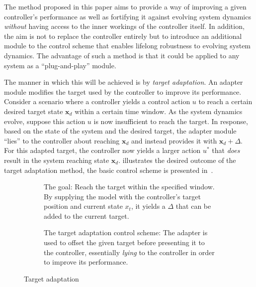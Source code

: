 The method proposed in this paper aims to provide a way of improving a given controller's performance as well as fortifying it against evolving system dynamics \emph{without} having access to the inner workings of the controller itself.
In addition, the aim is not to replace the controller entirely but to introduce an additional module to the control scheme that enables lifelong robustness to evolving system dynamics.
The advantage of such a method is that it could be applied to any system as a ``plug-and-play'' module.

The manner in which this will be achieved is by \emph{target adaptation}.
An adapter module modifies the target used by the controller to improve its performance.
Consider a scenario where a controller yields a control action $u$ to reach a certain desired target state $\mathbf{x}_d$ within a certain time window.
As the system dynamics evolve, suppose this action $u$ is now insufficient to reach the target.
In response, based on the state of the system and the desired target, the adapter module ``lies'' to the controller about reaching $\mathbf{x}_d$ and instead provides it with $\mathbf{x}_d+\Delta$.
For this adapted target, the controller now yields a larger action $u^*$ that \emph{does} result in the system reaching state $\mathbf{x}_d$.
 illustrates the desired outcome of the target adaptation method, the basic control scheme is presented in~.

\begin{figure}
    \centering
    \begin{subfigure}[t]{\linewidth}
        \centering
        \def\svgwidth{0.9\linewidth}
        \footnotesize\selectfont
        \caption{The goal: Reach the target within the specified window. By supplying the model with the controller's target position and current state $x_{t}$, it yields a $\Delta$ that can be added to the current target.}
        \label{fig:target-adaptation}
        \vspace*{1em} %
    \end{subfigure}
    \begin{subfigure}[t]{\linewidth}
        \centering
        \def\svgwidth{\linewidth}
        \footnotesize\selectfont
        \caption{The target adaptation control scheme: The adapter is used to offset the given target before presenting it to the controller, essentially \emph{lying} to the controller in order to improve its performance.}
        \label{fig:control-scheme}
    \end{subfigure}
    \caption{Target adaptation}
\end{figure}

